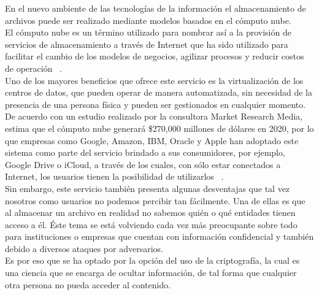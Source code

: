 


En el nuevo ambiente de las tecnologías de la información el almacenamiento de archivos puede ser realizado mediante modelos basados en el cómputo nube. \\
El cómputo nube es un término utilizado para nombrar así a la provisión de servicios de almacenamiento a través de Internet que ha sido utilizado para facilitar el cambio de los modelos de negocios, agilizar procesos y reducir costos de operación ~\cite{Nubei}. \\  

Uno de los mayores beneficios que ofrece este servicio es la virtualización de los centros de datos, que pueden operar de manera automatizada, sin necesidad de la presencia de una persona física y pueden ser gestionados en cualquier momento. De acuerdo con un estudio realizado por la consultora Market Research Media, estima que el cómputo nube generará \$270,000 millones de dólares en 2020, por lo que empresas como Google, Amazon, IBM, Oracle y Apple han adoptado este sistema como parte del servicio brindado a sus consumidores, por ejemplo, Google Drive o iCloud, a través de los cuales, con sólo estar conectados a Internet, los usuarios tienen la posibilidad de utilizarlos ~\cite{Nubecomp}. \\ 

Sin embargo, este servicio también presenta algunas desventajas que tal vez nosotros como usuarios no podemos percibir tan fácilmente. Una de ellas es que al almacenar un archivo en realidad no sabemos quién o qué entidades tienen acceso a él. Éste tema se está volviendo cada vez más preocupante sobre todo para instituciones o empresas que cuentan con información confidencial y también debido a diversos ataques por adversarios. \\

Es por eso que se ha optado por la opción del uso de la criptografía, la cual es una ciencia que se encarga de ocultar información, de tal forma que cualquier otra persona no pueda acceder al contenido. \\

